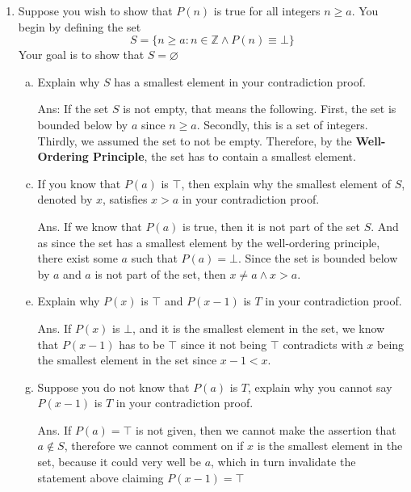 \documentclass[12pt]{article}
\newcommand{\T}[0]{\top}
\newcommand{\F}[0]{\bot}
\newcommand{\Z}{\mathbb{Z}}
\begin{document}
\begin{enumerate}
\begin{enumerate}
        \end{enumerate}
    \newpage
    \item Suppose you wish to show that $P(n)$ is true for all integers $n \geq a$. You begin by defining the set
        \[
        S =  \{ n \geq a : n \in \Z \wedge P(n) \equiv \F\}
        \]
        Your goal is to show that $S = \varnothing$
        \begin{enumerate}[a.]
            \item Explain why $S$ has a smallest element in your contradiction proof.
            \item[Ans:] If the set $S$ is not empty, that means the following. First, the set is bounded below by $a$ since $n \geq a$. Secondly, this is a set of integers. Thirdly, we assumed the set to not be empty. Therefore, by the \textbf{Well-Ordering Principle}, the set has to contain a smallest element.
            \\
            \item If you know that $P(a)$ is $\T$, then explain why the smallest element of $S$, denoted by $x$, satisfies $x>a$ in your contradiction proof.
            \item[Ans.] If we know that $P(a)$ is true, then it is not part of the set $S$. And as since the set has a smallest element by the well-ordering principle, there exist some $a$ such that $P(a) = \bot$. Since the set is bounded below by $a$ and $a$ is not part of the set, then $x\neq a \wedge x > a$.
            \\
            \item Explain why $P(x)$ is $\T$ and $P(x-1)$ is $T$ in your contradiction proof.
            \item[Ans.] If $P(x)$ is $\bot$, and it is the smallest element in the set, we know that $P(x-1)$ has to be $\top$ since it not being $\T$ contradicts with $x$ being the smallest element in the set since $x-1 < x$.
            \\
            \item Suppose you do not know that $P(a)$ is $T$, explain why you cannot say $P(x-1)$ is $T$ in your contradiction proof. 
            \item[Ans.] If $P(a)=\top$ is not given, then we cannot make the assertion that $a \notin S$, therefore we cannot comment on if $x$ is the smallest element in the set, because it could very well be $a$, which in turn invalidate the statement above claiming $P(x-1) = \top$ 
        \end{enumerate}


\end{enumerate}
\end{document}
